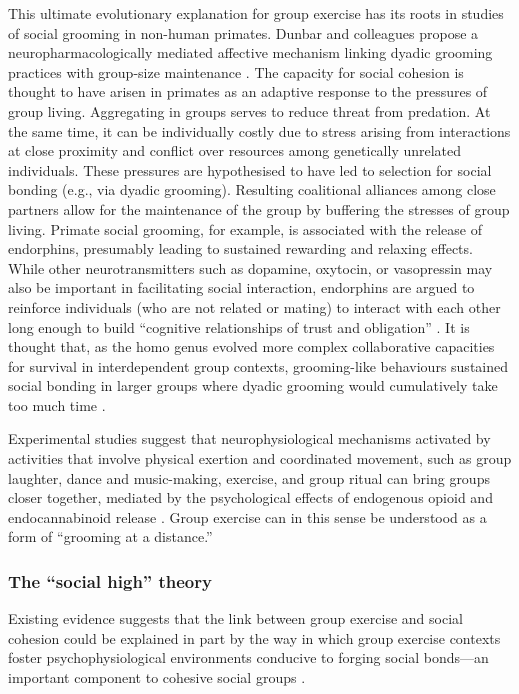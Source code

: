 This ultimate evolutionary explanation for group exercise has its roots in studies of social grooming in non-human primates. Dunbar and colleagues propose a neuropharmacologically mediated affective mechanism linking dyadic grooming practices with group-size maintenance \citep{Machin2011}.  The capacity for social cohesion is thought to have arisen in primates as an adaptive response to the pressures of group living.  Aggregating in groups serves to reduce threat from predation.  At the same time, it can be individually costly due to stress arising from interactions at close proximity and conflict over resources among genetically unrelated individuals.  These pressures are hypothesised to have led to selection for social bonding (e.g., via dyadic grooming).  Resulting coalitional alliances among close partners allow for the maintenance of the group by buffering the stresses of group living.  Primate social grooming, for example, is associated with the release of endorphins, presumably leading to sustained rewarding and relaxing effects.  While other neurotransmitters such as dopamine, oxytocin, or vasopressin may also be important in facilitating social interaction, endorphins are argued to reinforce individuals (who are not related or mating) to interact with each other long enough to build ``cognitive relationships of trust and obligation'' \citep[1839]{Dunbar2012}.  It is thought that, as the homo genus evolved more complex collaborative capacities for survival in interdependent group contexts, grooming-like behaviours sustained social bonding in larger groups where dyadic grooming would cumulatively take too much time \citep{Dunbar2012}.

Experimental studies suggest that neurophysiological mechanisms activated by activities that involve physical exertion and coordinated movement, such as group laughter, dance and music-making, exercise, and group ritual can bring groups closer together, mediated by the psychological effects of endogenous opioid and endocannabinoid release \citep{Cohen2009,Fischer2014a,Fischer2014,Sullivan2014,Tarr2016,Tarr2015}.  Group exercise can in this sense be understood as a form of ``grooming at a distance.''

\subsubsection{The ``social high'' theory\label{sect:socialHigh}}

Existing evidence suggests that the link between group exercise and social cohesion could be explained in part by the way in which group exercise contexts foster psychophysiological environments conducive to forging social bonds---an important component to cohesive social groups \citep{Dunbar2010}.






